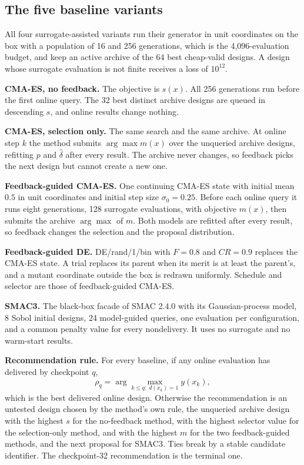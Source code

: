 \subsection{The five baseline variants}

All four surrogate-assisted variants run their generator in unit coordinates
on the box with a population of 16 and 256 generations, which is the
4{,}096-evaluation budget, and keep an active archive of the 64 best
cheap-valid designs. A design whose surrogate evaluation is not finite receives
a loss of $10^{12}$.

\textbf{CMA-ES, no feedback.} The objective is $s(x)$. All 256 generations run
before the first online query. The 32 best distinct archive designs are
queued in descending $s$, and online results change nothing.

\textbf{CMA-ES, selection only.} The same search and the same archive. At online
step $k$ the method submits $\arg\max m(x)$ over the unqueried archive designs,
refitting $p$ and $\hat{\delta}$ after every result. The archive never
changes, so feedback picks the next design but cannot create a new one.

\textbf{Feedback-guided CMA-ES.} One continuing CMA-ES state with initial mean
$0.5$ in unit coordinates and initial step size $\sigma_0 = 0.25$. Before each
online query it runs eight generations, 128 surrogate evaluations, with
objective $m(x)$, then submits the archive $\arg\max$ of $m$. Both models
are refitted after every result, so feedback changes the selection and the
proposal distribution.

\textbf{Feedback-guided DE.} DE/rand/1/bin with $F = 0.8$ and
$\mathit{CR} = 0.9$ replaces the CMA-ES state. A
trial replaces its parent when its merit is at least the parent's, and a
mutant coordinate outside the box is redrawn uniformly. Schedule and selector
are those of feedback-guided CMA-ES.

\textbf{SMAC3.} The black-box facade of SMAC 2.4.0 with its Gaussian-process
model, 8 Sobol initial designs, 24 model-guided queries, one evaluation per
configuration, and a common penalty value for every nondelivery. It uses no
surrogate and no warm-start results.

\textbf{Recommendation rule.} For every baseline, if any online evaluation has
delivered by checkpoint $q$,
\begin{equation}
\rho_q = \arg\max_{k \le q:\; d(x_k) = 1} y(x_k),
\label{eq:recommendation}
\end{equation}
which is the best delivered online design. Otherwise the recommendation is an
untested design chosen by the method's own rule, the unqueried archive design
with the highest $s$ for the no-feedback method, with the highest selector
value for the selection-only method, and with the highest $m$ for the two
feedback-guided methods, and the next proposal for SMAC3. Ties break by a
stable candidate identifier. The checkpoint-32 recommendation is the terminal
one.

